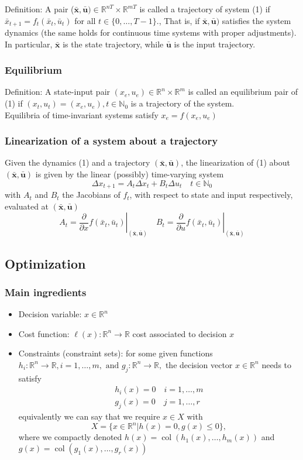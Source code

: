 \documentclass{book}
\newcommand\at[2]{\left.#1\right|_{#2}}
\DeclareMathOperator{\col}{col}
\newcommand{\R}{\mathbb{R}}
\newcommand{\N}{\mathbb{N}}
\theoremstyle{definition}
\theoremstyle{remark}
\theoremstyle{remark}
\begin{document}
Definition: A pair ($\bar{\mathbf{x}},\bar{\mathbf{u}})\in\R^{nT} \times \R^{mT}$ is called a trajectory of system (1) %
if $\bar{x}_{t+1}=f_t(\bar{x}_t,\bar{u}_t)$ for all $t\in\{0,\dots,T-1\}$., That is, if $\bar{\mathbf{x}},\bar{\mathbf{u}})$ satisfies the system dynamics (the same holds for continuous time systems with proper adjustments). In particular, $\bar{\mathbf{x}}$ is the state trajectory, while $\bar{\mathbf{u}}$ is the input trajectory.

\subsubsection{Equilibrium}
Definition: A state-input pair $(x_e,u_e)\in\R^n\times\R^m$ is called an equilibrium pair of (1) %
if $(x_t,u_t)=(x_e,u_e),t\in\N_0$ is a trajectory of the system. \\
Equilibria of time-invariant systems satisfy $x_e=f(x_e,u_e)$

\subsubsection{Linearization of a system about a trajectory}
Given the dynamics (1)%
and a trajectory $(\bar{\mathbf{x}},\bar{\mathbf{u}})$, the linearization of (1) about $(\bar{\mathbf{x}},\bar{\mathbf{u}})$ is given by the linear (possibly) time-varying system 
\[
    \Delta x_{t+1} = A_t\Delta x_t + B_t \Delta u_t \quad t\in\N_0
\]
with $A_t$ and $B_t$ the Jacobians of $f_t$, with respect to state and input respectively, evaluated at $(\bar{\mathbf{x}},\bar{\mathbf{u}})$
\[
    A_t = \at{\displaystyle\frac{\partial}{\partial x}f(\bar{x}_t,\bar{u}_t)}{(\bar{\mathbf{x}},\bar{\mathbf{u}})} \quad B_t = \at{\displaystyle\frac{\partial}{\partial u}f(\bar{x}_t,\bar{u}_t)}{(\bar{\mathbf{x}},\bar{\mathbf{u}})}
\]

\subsection{Optimization}
\subsubsection{Main ingredients}
\begin{itemize}
    \item Decision variable: $x\in\R^n$ 
    \item Cost function: $\ell(x):\R^n\to\R$ cost associated to decision $x$
    \item Constraints (constraint sets): for some given functions $h_i:\R^n\to\R, i=1,\dots,m, \text{ and } g_j:\R^n\to\R,$ the decision vector $x\in\R^n$ needs to satisfy 
        \begin{gather*}
            h_i(x)=0 \quad i=1,\dots,m \\
            g_j(x)=0 \quad j=1,\dots,r
        \end{gather*}
        equivalently we can say that we require $x\in X$ with 
        \[
            X=\{x\in\R^n|h(x)=0, g(x)\leq 0\},
        \]
        where we compactly denoted $h(x)=\col(h_1(x),\dots,h_m(x))$ and $g(x) = \col(g_1(x),\dots,g_r(x))$
\end{itemize}
\end{document}
